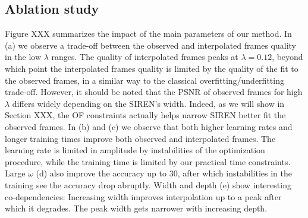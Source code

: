 \documentclass{article}
\begin{document}
\subsection{Ablation study}
\label{sec_abl}

Figure XXX summarizes the impact of the main parameters of our method.
In (a) we observe a trade-off between the observed and interpolated frames quality in the low $\lambda$ ranges.
The quality of interpolated frames peaks at $\lambda=0.12$, beyond which point the interpolated frames quality is limited
by the quality of the fit to the observed frames, in a similar way to the classical overfitting/underfitting trade-off.
However, it should be noted that the PSNR of observed frames for high $\lambda$ differs widely depending on the SIREN's width.
Indeed, as we will show in Section XXX, the OF constraints actually helps narrow SIREN better fit the observed frames.
In (b) and (c) we observe that both higher learning rates and longer training times improve both observed and interpolated frames.
The learning rate is limited in amplitude by instabilities of the optimization procedure,
while the training time is limited by our practical time constraints.
Large $\omega$ (d) also improve the accuracy up to 30, after which instabilities in the training see the accuracy drop abruptly.
Width and depth (e) show interesting co-dependencies:
Increasing width improves interpolation up to a peak after which it degrades.
The peak width gets narrower with increasing depth.
\end{document}
